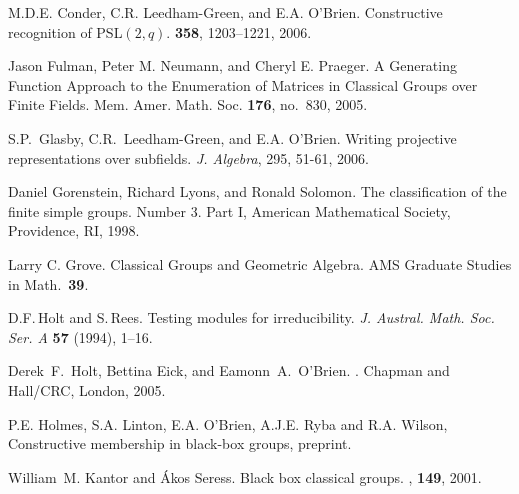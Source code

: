 \documentclass[12pt]{article}
\begin{document}
\begin{thebibliography}{10}


M.D.E. Conder, C.R. Leedham-Green, and E.A. O'Brien.
\newblock Constructive recognition of PSL$(2, q)$.
 {\bf 358}, 1203--1221, 2006.

Jason Fulman, Peter M. Neumann, and Cheryl E. Praeger.
A Generating Function Approach to the Enumeration
of Matrices in Classical Groups over Finite Fields.
Mem. Amer. Math. Soc. {\bf 176}, no.\ 830, 2005.

 S.P.\ Glasby, C.R.\ Leedham-Green, and E.A. O'Brien.
Writing projective representations over subfields.
{\it J. Algebra}, 295, 51-61, 2006.

Daniel Gorenstein, Richard Lyons, and  Ronald Solomon.
The classification of the finite simple groups. Number 3. Part I,
American Mathematical Society, Providence, RI, 1998. 

Larry C. Grove. Classical Groups and Geometric Algebra.
AMS Graduate Studies in Math.\ {\bf 39}.


 D.F.\,Holt and S.\,Rees. Testing modules for
irreducibility. {\it J. Austral. Math. Soc. Ser. A} {\bf 57} (1994), 1--16.

Derek~F.\ Holt, Bettina Eick, and Eamonn~A.\ O'Brien.
.
\newblock Chapman and Hall/CRC, London, 2005.

 P.E. Holmes, S.A. Linton, E.A. O'Brien, A.J.E. Ryba and
R.A. Wilson, Constructive membership in black-box groups, preprint.

William~M. Kantor and {\'A}kos Seress.
\newblock Black box classical groups.
, {\bf 149}, 2001.
                             

\end{thebibliography}
\end{document}

